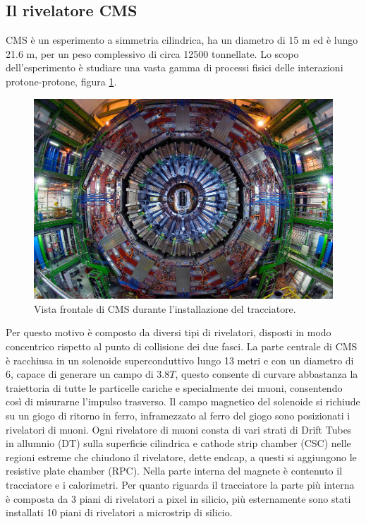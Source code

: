 \subsection{Il rivelatore CMS}
CMS è un esperimento a simmetria cilindrica, ha un diametro di 15 m ed è lungo 21.6 m, per un peso complessivo di circa 12500 tonnellate. Lo scopo dell'esperimento è studiare una vasta gamma di processi fisici delle interazioni protone-protone, figura \ref{CMS}. 
\begin{figure}
\centering
\includegraphics[scale=.2]{Immagini/CMS}
\caption{Vista frontale di CMS durante l'installazione del tracciatore.}
\label{CMS}
\end{figure}
Per questo motivo è composto da diversi tipi di rivelatori, disposti in modo concentrico rispetto al punto di collisione dei due fasci. 
La parte centrale di CMS è racchiusa in un solenoide superconduttivo lungo 13 metri e con un diametro di 6, capace di generare un campo di $3.8 T$, questo consente  di curvare abbastanza la traiettoria di tutte le particelle cariche e specialmente dei muoni, consentendo così di misurarne l'impulso trasverso. Il campo magnetico del solenoide si richiude su un giogo di ritorno in ferro, inframezzato al ferro del giogo sono posizionati i rivelatori di muoni. Ogni rivelatore di muoni consta di vari strati di Drift Tubes in allumnio (DT) sulla superficie cilindrica e cathode strip chamber (CSC) nelle regioni estreme che chiudono il rivelatore, dette endcap, a questi si aggiungono le resistive plate chamber (RPC). 
Nella parte interna del magnete è contenuto il tracciatore e i calorimetri. Per quanto riguarda il tracciatore la parte più interna è composta da 3 piani di rivelatori a pixel in  silicio, più esternamente sono stati installati 10 piani di rivelatori a microstrip di silicio. 
